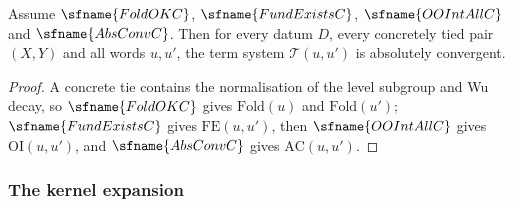 \begin{corollary}\label{pf:sh-siegel:absconvtied}
Assume $\sfname{FoldOKC}$, $\sfname{FundExistsC}$, $\sfname{OOIntAllC}$ and $\sfname{AbsConvC}$. Then for every datum $D$,
every concretely tied pair $(X,Y)$ and all words $u,u'$, the term system $\mathcal T(u,u')$ is absolutely convergent.
\end{corollary}

\begin{proof}
A concrete tie contains the normalisation of the level subgroup and Wu decay, so $\sfname{FoldOKC}$ gives
$\mathrm{Fold}(u)$ and $\mathrm{Fold}(u')$; $\sfname{FundExistsC}$ gives $\mathrm{FE}(u,u')$, then $\sfname{OOIntAllC}$ gives
$\mathrm{OI}(u,u')$, and $\sfname{AbsConvC}$ gives $\mathrm{AC}(u,u')$.
\end{proof}

\subsubsection{The kernel expansion}

